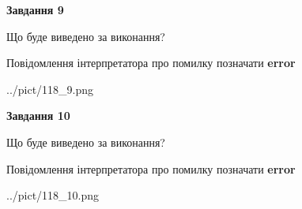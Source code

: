 \documentclass[12pt, ukrainian]{article}
\begin{document}
{{\begin {center}\textbf{Завдання 9}\end {center}}\par
Що буде виведено за виконання? \par
Повідомлення інтерпретатора про помилку позначати \textbf{error}

\begin{center}
	{../pict/118_9.png}
\end{center}
\newpage

{\begin {center}\textbf{Завдання 10}\end {center}}\par
Що буде виведено за виконання? \par
Повідомлення інтерпретатора про помилку позначати \textbf{error}

\begin{center}
	{../pict/118_10.png}
\end{center}
\newpage

}
\end{document}
